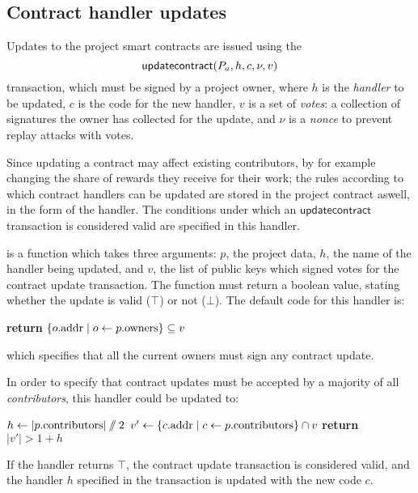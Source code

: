 \subsection{Contract handler updates}

Updates to the project smart contracts are issued using the
\[
    \mathsf{updatecontract}\lparen P_a, h, c, \nu, v\rparen
\]
transaction, which must be signed by a project owner, where $h$ is the
\emph{handler} to be updated, $c$ is the code for the new handler, $v$ is a set
of \emph{votes}: a collection of signatures the owner has collected for the
update, and $\nu$ is a \emph{nonce} to prevent replay attacks with votes.

Since updating a contract may affect existing contributors, by for example
changing the share of rewards they receive for their work; the rules according
to which contract handlers can be updated are stored in the project contract
aswell, in the form of the  handler.  The
conditions under which an $\mathsf{updatecontract}$ transaction is considered
valid are specified in this handler.

 is a function which takes three arguments: $p$,
the project data, $h$, the name of the handler being updated, and $v$, the list
of public keys which signed votes for the contract update transaction. The
function must return a boolean value, stating whether the update is valid ($\top$)
or not ($\bot$). The default code for this handler is:
\begin{algorithmic}[0]
        \State \textbf{return} $\{ o.{\mathrm{addr}} \mid o \gets p.{\mathrm{owners}} \} \subseteq v$
    \EndProcedure
\end{algorithmic}
which specifies that all the current owners must sign any contract update.

In order to specify that contract updates must be accepted by a majority of all
\emph{contributors}, this handler could be updated to:
\medskip
\begin{algorithmic}[0]
        \State $h \gets |p.{\mathrm{contributors}}| \sslash 2$
        \State $v' \gets \{ c.{\mathrm{addr}} \mid c \gets p.{\mathrm{contributors}} \} \cap v$
        \State \textbf{return} $|v'| > 1 + h$
    \EndProcedure
\end{algorithmic}
If the handler returns $\top$, the contract update transaction is considered
valid, and the handler $h$ specified in the transaction is updated with the new code
$c$.

